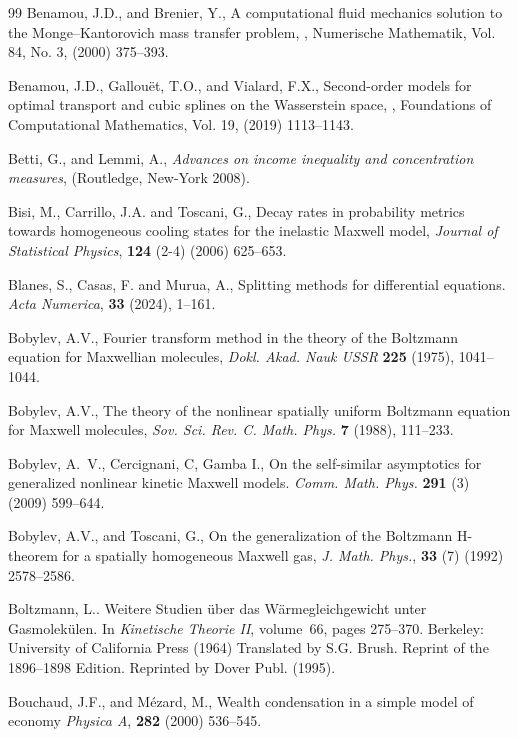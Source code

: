 \documentclass{article}
\begin{document}
\begin{thebibliography}{99}
Benamou, J.D., and Brenier, Y., A computational fluid mechanics solution to the Monge--Kantorovich mass transfer problem,  , Numerische Mathematik, Vol. 84, No. 3, (2000) 375--393.

Benamou, J.D., Gallouët, T.O., and Vialard, F.X., Second-order models for optimal transport and cubic splines on the Wasserstein space,  , Foundations of Computational Mathematics, Vol. 19, (2019) 1113--1143.

Betti, G., and Lemmi, A., \textit{Advances on income inequality and concentration measures}, (Routledge, New-York  2008).

Bisi,  M., Carrillo, J.A. and Toscani, G., Decay rates in probability metrics towards homogeneous cooling states for the inelastic Maxwell model,  \emph{Journal of Statistical Physics}, \textbf{124} (2-4) (2006) 625--653.

Blanes, S., Casas, F. and Murua, A., Splitting methods for differential equations. \emph{Acta Numerica}, \textbf{33} (2024), 1--161.




Bobylev, A.V., Fourier transform method in the theory of the Boltzmann equation for Maxwellian molecules, \emph{Dokl. Akad. Nauk USSR} \textbf{225} (1975), 1041--1044.

Bobylev, A.V.,  The theory of the nonlinear spatially uniform Boltzmann equation for Maxwell molecules, \emph{Sov. Sci. Rev. C. Math. Phys.} \textbf{7} (1988), 111--233.

 Bobylev, A.~V., Cercignani, C, Gamba I.,
On the self-similar asymptotics for genera\-lized nonlinear kinetic
  {M}axwell models.
 \emph{Comm. Math. Phys.} \textbf{291} (3)  (2009) 599--644.

Bobylev, A.V., and Toscani, G., On the generalization of the Boltzmann H-theorem for a spatially homogeneous Maxwell gas, \emph{J. Math. Phys.}, \textbf{33} (7) (1992) 2578--2586.



Boltzmann, L..
\newblock Weitere Studien {\"u}ber das W{\"a}rmegleichgewicht unter
  Gasmolek{\"u}len.
\newblock In \emph{Kinetische Theorie II}, volume~66, pages 275--370.
\newblock Berkeley: University of California Press (1964) Translated by S.G.
  Brush. Reprint of the 1896--1898 Edition. Reprinted by Dover Publ.  (1995).

  
Bouchaud, J.F.,  and  M\'ezard, M., {Wealth condensation in a
simple model of economy} \emph{Physica A\/}, {\bf 282} (2000) 536--545.
  


\end{thebibliography}
\end{document}
